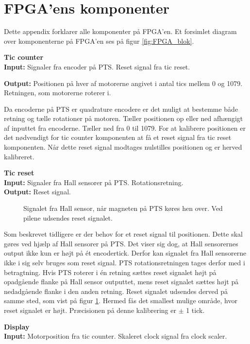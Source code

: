 \section{FPGA'ens komponenter}
\label{sec:fpgaappendix}
Dette appendix forklarer alle komponenter på FPGA'en.
Et forsimlet diagram over komponenterne på FPGA'en ses på figur \ref{fig:FPGA_blok}.


\textbf{Tic counter}\\
\textbf{Input:}
Signaler fra encoder på PTS. Reset signal fra tic reset.

\textbf{Output:} Positionen på hver af motorerne angivet i antal tics mellem 0 
og 1079. Retningen, som motorerne roterer i. 

Da encoderne på PTS er quadrature encodere er det muligt at bestemme både retning og 
tælle rotationer på motoren.
Tæller positionen op eller ned afhængigt af inputtet fra encoderne. 
Tæller ned fra 0 til 1079.
For at kalibrere positionen er det nødvendigt for tic counter komponenten at få 
et reset signal fra tic reset komponenten. 
Når dette reset signal modtages nulstilles positionen og er herved kalibreret.

\textbf{Tic reset}\\
\textbf{Input:} Signaler fra Hall sensorer på PTS. Rotationsretning.\\
\textbf{Output:} Reset signal.

\begin{figure}[!th]
\centering

\caption[Signal fra Hall sensor]{Signalet fra Hall sensor, når magneten på PTS køres hen over. Ved pilene udsendes reset signalet.}
\label{fig:hall_sensor_signal}
\end{figure}

Som beskrevet tidligere er der behov for et reset signal til positionen. 
Dette skal gøres ved hjælp af Hall sensorer på PTS. 
Det viser sig dog, at Hall sensorernes output ikke kun er højt på ét encodertick. 
Derfor kan signalet fra Hall sensorerne ikke i sig selv bruges som reset signal.
PTS rotationsretningen tages derfor med i betragtning.
Hvis PTS roterer i én retning sættes reset signalet højt på opadgående 
flanke på Hall sensor outputtet, mens reset signalet sættes højt på nedadgående 
flanke i den anden retning. Reset signalet udsendes derved på samme sted, som vist på figur \ref{fig:hall_sensor_signal}.
Hermed fås det smallest mulige område, hvor reset signalet er højt.
Præcisionen på denne kalibrering er $\pm$ 1 tick.

\textbf{Display}\\
\textbf{Input:} Motorposition fra tic counter. Skaleret clock signal fra clock 
scaler.

